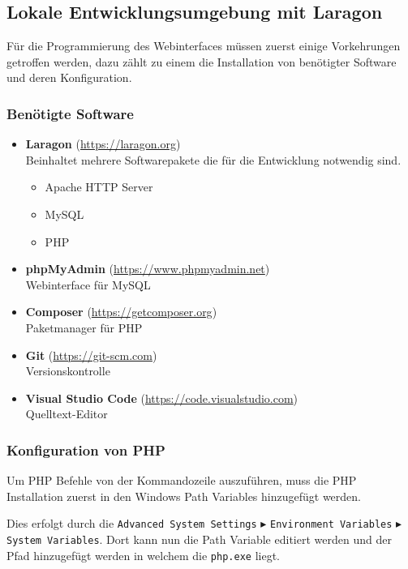 \subsection{Lokale Entwicklungsumgebung mit Laragon}
Für die Programmierung des Webinterfaces müssen zuerst einige Vorkehrungen
getroffen werden, dazu zählt zu einem die Installation von benötigter Software
und deren Konfiguration.

\subsubsection{Benötigte Software}

\begin{itemize}
  \item \textbf{Laragon} (\url{https://laragon.org}) \\Beinhaltet mehrere
        Softwarepakete die für die Entwicklung notwendig sind.
        \begin{itemize}
          \item Apache HTTP Server
          \item MySQL
          \item PHP
        \end{itemize}
  \item \textbf{phpMyAdmin} (\url{https://www.phpmyadmin.net}) \\ Webinterface
        für MySQL
  \item \textbf{Composer} (\url{https://getcomposer.org}) \\ Paketmanager für
        PHP
  \item \textbf{Git} (\url{https://git-scm.com}) \\ Versionskontrolle
  \item \textbf{Visual Studio Code} (\url{https://code.visualstudio.com}) \\
        Quelltext-Editor
\end{itemize}


\subsubsection{Konfiguration von PHP}
Um PHP Befehle von der Kommandozeile auszuführen, muss die PHP Installation zuerst in
den Windows Path Variables hinzugefügt werden.

Dies erfolgt durch die \verb|Advanced System Settings| $\blacktriangleright$
\verb|Environment Variables| $\blacktriangleright$ \verb|System Variables|. Dort
kann nun die Path Variable editiert werden und der Pfad hinzugefügt werden in
welchem die \verb|php.exe| liegt.

